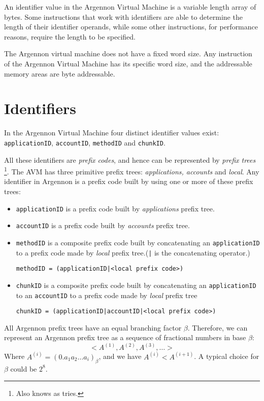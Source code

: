 \documentclass[11pt, a4paper]{report}
\begin{document}
    An identifier value in the Argennon Virtual Machine is a variable length array of bytes. Some instructions
    that work with identifiers are able to determine the length of their identifier operands, while some
    other instructions, for performance reasons, require the length to be specified.

    The Argennon virtual machine does not have a fixed word size. Any instruction of the Argennon Virtual Machine has
    its specific word size, and the addressable memory areas are byte addressable.


    \section{Identifiers}\label{sec:identifiers}

    In the Argennon Virtual Machine four distinct identifier values exist: \texttt{applicationID}, \texttt{accountID},
    \texttt{methodID} and \texttt{chunkID}.

    All these identifiers are \emph{prefix codes}, and hence can be represented by
    \emph{prefix trees} \footnote{Also knows as tries.}. The AVM has three primitive prefix trees:
    \emph{applications, accounts} and \emph{local}. Any identifier in Argennon is a
    prefix code built by using one or more of these prefix trees:
    \begin{itemize}
        \item \texttt{applicationID} is a prefix code built by \emph{applications} prefix tree.
        \item \texttt{accountID} is a prefix code built by \emph{accounts} prefix tree.
        \item \texttt{methodID} is a composite prefix code built by concatenating an \texttt{applicationID} to
        a prefix code made by \emph{local} prefix tree.(\texttt{|} is the concatenating operator.)

        \texttt{methodID = (applicationID|<local prefix code>)}
        \item \texttt{chunkID} is a composite prefix code built by concatenating an \texttt{applicationID} to
        an \texttt{accountID} to a prefix code made by \emph{local} prefix tree

        \texttt{chunkID = (applicationID|accountID|<local prefix code>)}
    \end{itemize}

    All Argennon prefix trees have an equal branching factor \(\beta\). Therefore, we can represent an Argennon
    prefix tree as a sequence of fractional numbers in base \(\beta\):
    \[
        <A^{(1)},A^{(2)},A^{(3)},\dots>
    \]
    Where \(A^{(i)}=(0.a_{1}a_{2}\dots a_{i})_\beta\), and we have \(A^{(i)}<A^{(i+1)}\). A typical choice for \(\beta\)
    could be \(2^8\).
\end{document}
